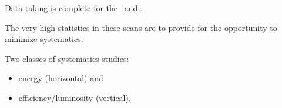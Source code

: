 \begin{slide*}

\slideframe{}
\huge
{}

\begin{minipage}[t]{\linewidth}
\Large

{\LARGE Data-taking is complete for the \ys\  and \ysss.}

\vspace{1 cm}


\vspace{1 cm}

The very high statistics in these scans are to provide for the
opportunity to minimize systematics.

\vspace{1 cm}

Two classes of systematics studies:

\begin{center}
\begin{minipage}[t]{10 cm}
\begin{itemize}
  \LARGE \item energy (horizontal) and
  \LARGE \item efficiency/luminosity (vertical).
\end{itemize}
\end{minipage}
\end{center}

\end{minipage}

\end{slide*}


